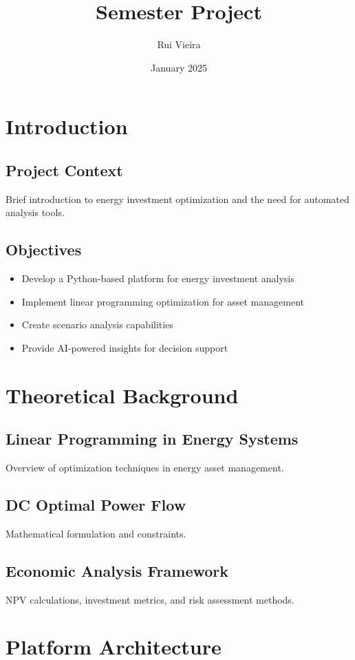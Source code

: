 \documentclass{article}
\title{Semester Project}
\author{Rui Vieira}
\date{January 2025}
\begin{document}

\tableofcontents
\newpage

\section{Introduction}
\subsection{Project Context}
Brief introduction to energy investment optimization and the need for automated analysis tools.

\subsection{Objectives}
\begin{itemize}
    \item Develop a Python-based platform for energy investment analysis
    \item Implement linear programming optimization for asset management
    \item Create scenario analysis capabilities
    \item Provide AI-powered insights for decision support
\end{itemize}

\section{Theoretical Background}
\subsection{Linear Programming in Energy Systems}
Overview of optimization techniques in energy asset management.

\subsection{DC Optimal Power Flow}
Mathematical formulation and constraints.

\subsection{Economic Analysis Framework}
NPV calculations, investment metrics, and risk assessment methods.

\section{Platform Architecture}
\end{document}
